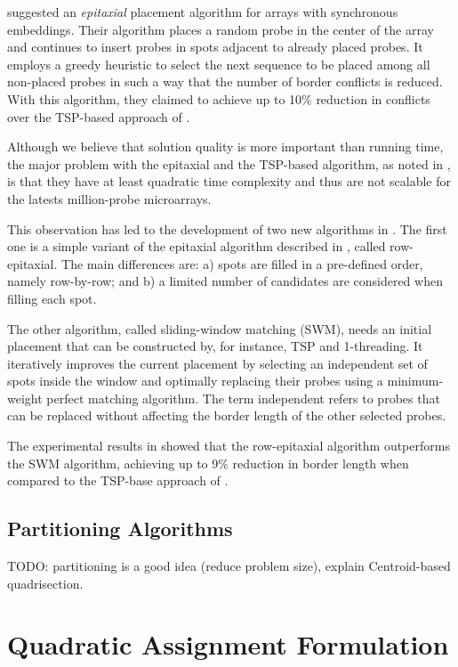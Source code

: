 \documentclass{bioinfo}
\begin{document}
\citealp{KAHNG02} suggested an \emph{epitaxial} placement algorithm for arrays with synchronous embeddings. Their algorithm places a random probe in the center of the array and continues to insert probes in spots adjacent to already placed probes. It employs a greedy heuristic to select the next sequence to be placed among all non-placed probes in such a way that the number of border conflicts is reduced. With this algorithm, they claimed to achieve up to 10\% reduction in conflicts over the TSP-based approach of \citealp{HANNENHALLI02}.

Although we believe that solution quality is more important than running time, the major problem with the epitaxial and the TSP-based algorithm, as noted in \citealp{KAHNG03_1}, is that they have at least quadratic time complexity and thus are not scalable for the latests million-probe microarrays.

This observation has led to the development of two new algorithms in \citealp{KAHNG03_1}. The first one is a simple variant of the epitaxial algorithm described in \citealp{KAHNG02}, called row-epitaxial. The main differences are: a) spots are filled in a pre-defined order, namely row-by-row; and b) a limited number of candidates are considered when filling each spot.

The other algorithm, called sliding-window matching (SWM), needs an initial placement that can be constructed by, for instance, TSP and 1-threading. It iteratively improves the current placement by selecting an independent set of spots inside the window and optimally replacing their probes using a minimum-weight perfect matching algorithm. The term independent refers to probes that can be replaced without affecting the border length of the other selected probes.

The experimental results in \citealp{KAHNG03_1} showed that the row-epitaxial algorithm outperforms the SWM algorithm, achieving up to 9\% reduction in border length when compared to the TSP-base approach of \citealp{HANNENHALLI02}.

\subsection{Partitioning Algorithms}

TODO: partitioning is a good idea (reduce problem size), explain Centroid-based quadrisection.

\section{Quadratic Assignment Formulation}
\end{document}
